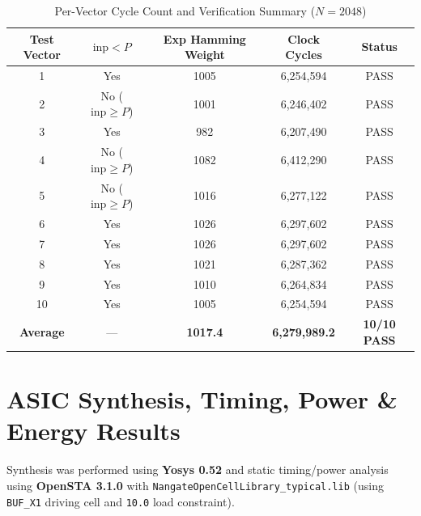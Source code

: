 \documentclass[11pt,a4paper]{article}
\begin{document}
\begin{table}[h!]
\centering
\caption{Per-Vector Cycle Count and Verification Summary ($N = 2048$)}
\small
\begin{tabular}{@{}ccccc@{}}
\toprule
\textbf{Test Vector} & \textbf{$\text{inp} < P$} & \textbf{Exp Hamming Weight} & \textbf{Clock Cycles} & \textbf{Status} \\
\midrule
1 & Yes & 1005 & 6,254,594 & PASS \\
2 & No ($\text{inp} \ge P$) & 1001 & 6,246,402 & PASS \\
3 & Yes & 982 & 6,207,490 & PASS \\
4 & No ($\text{inp} \ge P$) & 1082 & 6,412,290 & PASS \\
5 & No ($\text{inp} \ge P$) & 1016 & 6,277,122 & PASS \\
6 & Yes & 1026 & 6,297,602 & PASS \\
7 & Yes & 1026 & 6,297,602 & PASS \\
8 & Yes & 1021 & 6,287,362 & PASS \\
9 & Yes & 1010 & 6,264,834 & PASS \\
10 & Yes & 1005 & 6,254,594 & PASS \\
\midrule
\textbf{Average} & --- & \textbf{1017.4} & \textbf{6,279,989.2} & \textbf{10/10 PASS} \\
\bottomrule
\end{tabular}
\end{table}

\section{ASIC Synthesis, Timing, Power \& Energy Results}
Synthesis was performed using \textbf{Yosys 0.52} and static timing/power analysis using \textbf{OpenSTA 3.1.0} with \texttt{NangateOpenCellLibrary\_typical.lib} (using \texttt{BUF\_X1} driving cell and \texttt{10.0} load constraint).
\end{document}
